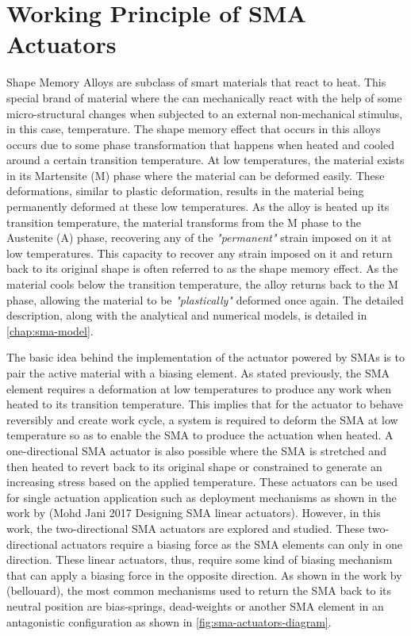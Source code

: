 \section{Working Principle of SMA Actuators}
Shape Memory Alloys are subclass of smart materials that react to heat. This special brand of material where the can mechanically react with the help of some micro-structural changes when subjected to an external non-mechanical stimulus, in this case, temperature. The shape memory effect that occurs in this alloys occurs due to some phase transformation that happens when heated and cooled around a certain transition temperature. At low temperatures, the material exists in its Martensite (M) phase where the material can be deformed easily. These deformations, similar to plastic deformation, results in the material being permanently deformed at these low temperatures. As the alloy is heated up its transition temperature, the material transforms from the M phase to the Austenite (A) phase, recovering any of the \textit{"permanent"} strain imposed on it at low temperatures. This capacity to recover any strain imposed on it and return back to its original shape is often referred to as the shape memory effect. As the material cools below the transition temperature, the alloy returns back to the M phase, allowing the material to be \textit{"plastically"} deformed once again. The detailed description, along with the analytical and numerical models, is detailed in \cref{chap:sma-model}.

The basic idea behind the implementation of the actuator powered by SMAs is to pair the active material with a biasing element. As stated previously, the SMA element requires a deformation at low temperatures to produce any work when heated to its transition temperature. This implies that for the actuator to behave reversibly and create work cycle, a system is required to deform the SMA at low temperature so as to enable the SMA to produce the actuation when heated. A one-directional SMA actuator is also possible where the SMA is stretched and then heated to revert back to its original shape or constrained to generate an increasing stress based on the applied temperature. These actuators can be used for single actuation application such as deployment mechanisms as shown in the work by \todocite (Mohd Jani 2017 Designing SMA linear actuators). However, in this work, the two-directional SMA actuators are explored and studied. These two-directional actuators require a biasing force as the SMA elements can only in one direction. These linear actuators, thus, require some kind of biasing mechanism that can apply a biasing force in the opposite direction. As shown in the work by \todocite (bellouard), the most common mechanisms used to return the SMA back to its neutral position are bias-springs, dead-weights or another SMA element in an antagonistic configuration as shown in \cref{fig:sma-actuators-diagram}.

